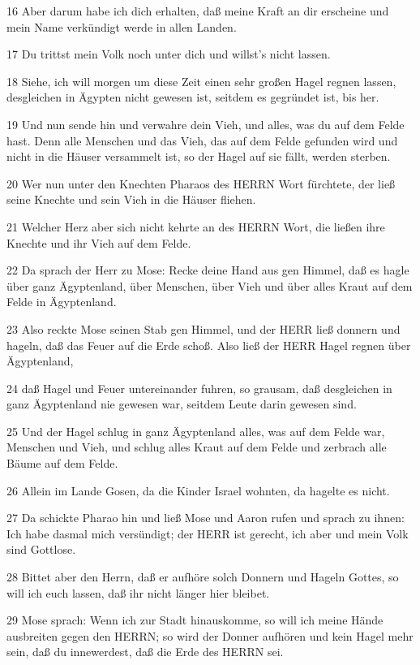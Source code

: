 \par 16 Aber darum habe ich dich erhalten, daß meine Kraft an dir erscheine und mein Name verkündigt werde in allen Landen.
\par 17 Du trittst mein Volk noch unter dich und willst's nicht lassen.
\par 18 Siehe, ich will morgen um diese Zeit einen sehr großen Hagel regnen lassen, desgleichen in Ägypten nicht gewesen ist, seitdem es gegründet ist, bis her.
\par 19 Und nun sende hin und verwahre dein Vieh, und alles, was du auf dem Felde hast. Denn alle Menschen und das Vieh, das auf dem Felde gefunden wird und nicht in die Häuser versammelt ist, so der Hagel auf sie fällt, werden sterben.
\par 20 Wer nun unter den Knechten Pharaos des HERRN Wort fürchtete, der ließ seine Knechte und sein Vieh in die Häuser fliehen.
\par 21 Welcher Herz aber sich nicht kehrte an des HERRN Wort, die ließen ihre Knechte und ihr Vieh auf dem Felde.
\par 22 Da sprach der Herr zu Mose: Recke deine Hand aus gen Himmel, daß es hagle über ganz Ägyptenland, über Menschen, über Vieh und über alles Kraut auf dem Felde in Ägyptenland.
\par 23 Also reckte Mose seinen Stab gen Himmel, und der HERR ließ donnern und hageln, daß das Feuer auf die Erde schoß. Also ließ der HERR Hagel regnen über Ägyptenland,
\par 24 daß Hagel und Feuer untereinander fuhren, so grausam, daß desgleichen in ganz Ägyptenland nie gewesen war, seitdem Leute darin gewesen sind.
\par 25 Und der Hagel schlug in ganz Ägyptenland alles, was auf dem Felde war, Menschen und Vieh, und schlug alles Kraut auf dem Felde und zerbrach alle Bäume auf dem Felde.
\par 26 Allein im Lande Gosen, da die Kinder Israel wohnten, da hagelte es nicht.
\par 27 Da schickte Pharao hin und ließ Mose und Aaron rufen und sprach zu ihnen: Ich habe dasmal mich versündigt; der HERR ist gerecht, ich aber und mein Volk sind Gottlose.
\par 28 Bittet aber den Herrn, daß er aufhöre solch Donnern und Hageln Gottes, so will ich euch lassen, daß ihr nicht länger hier bleibet.
\par 29 Mose sprach: Wenn ich zur Stadt hinauskomme, so will ich meine Hände ausbreiten gegen den HERRN; so wird der Donner aufhören und kein Hagel mehr sein, daß du innewerdest, daß die Erde des HERRN sei.
